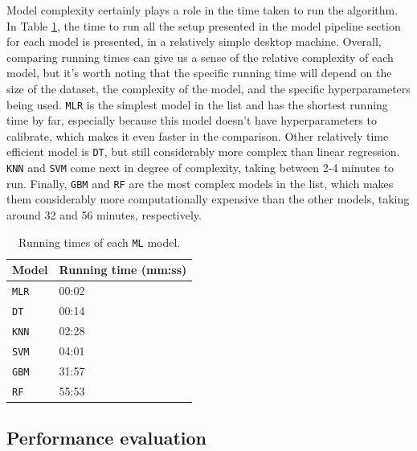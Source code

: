 \documentclass[12pt]{article}
\begin{document}
\par Model complexity certainly plays a role in the time taken to run the algorithm. In Table \ref{tab:runtime}, the time to run all the setup presented in the model pipeline section for each model is presented, in a relatively simple desktop machine. Overall, comparing running times can give us a sense of the relative complexity of each model, but it's worth noting that the specific running time will depend on the size of the dataset, the complexity of the model, and the specific hyperparameters being used. \texttt{MLR} is the simplest model in the list and has the shortest running time by far, especially because this model doesn’t have hyperparameters to calibrate, which makes it even faster in the comparison. Other relatively time efficient model is \texttt{DT}, but still considerably more complex than linear regression. \texttt{KNN} and \texttt{SVM} come next in degree of complexity, taking between 2-4 minutes to run. Finally, \texttt{GBM} and \texttt{RF} are the most complex models in the list, which makes them considerably more computationally expensive than the other models, taking around 32 and 56 minutes, respectively.
\begin{table}[t]
\centering
\tiny
{}
\begin{tabular}{p{4cm}p{4cm}}
\toprule
\textbf{Model} & \textbf{Running time (mm:ss)}\\
\midrule
\texttt{MLR} & 00:02 \\
\texttt{DT}  & 00:14 \\
\texttt{KNN} & 02:28 \\
\texttt{SVM} & 04:01 \\
\texttt{GBM} & 31:57 \\
\texttt{RF}  & 55:53 \\
\bottomrule
\end{tabular}
\caption{Running times of each \texttt{ML} model.}
\label{tab:runtime}
\end{table}


\subsection{Performance evaluation} \label{results:performance}
\end{document}
